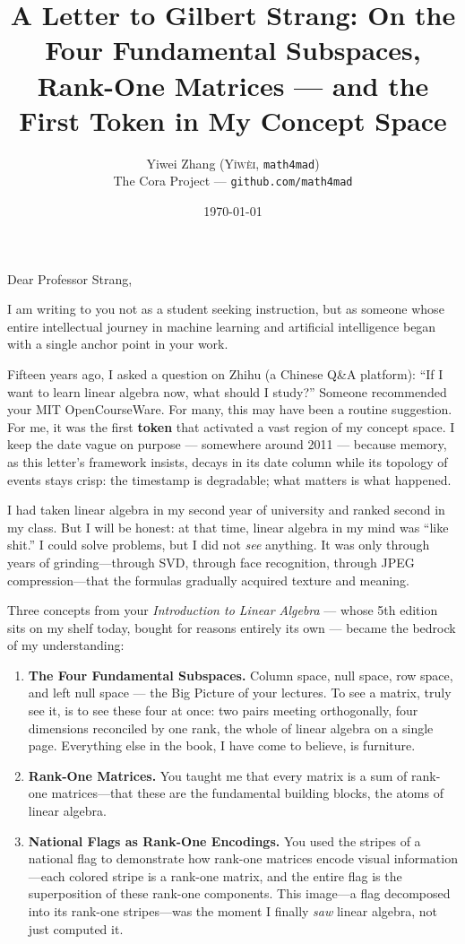 \documentclass[11pt, a4paper]{article}
\title{\textbf{A Letter to Gilbert Strang: On the Four Fundamental Subspaces, Rank-One Matrices --- and the First Token in My Concept Space}}
\author{Yiwei Zhang (\textsc{Y\v{i}w\`{e}i}, \texttt{math4mad}) \\ \small The Cora Project --- \texttt{github.com/math4mad}}
\date{\today}
\begin{document}
\maketitle

Dear Professor Strang,

I am writing to you not as a student seeking instruction, but as someone whose entire intellectual journey in machine learning and artificial intelligence began with a single anchor point in your work.

Fifteen years ago, I asked a question on Zhihu (a Chinese Q\&A platform): ``If I want to learn linear algebra now, what should I study?'' Someone recommended your MIT OpenCourseWare. For many, this may have been a routine suggestion. For me, it was the first \textbf{token} that activated a vast region of my concept space. I keep the date vague on purpose --- somewhere around 2011 --- because memory, as this letter's framework insists, decays in its date column while its topology of events stays crisp: the timestamp is degradable; what matters is what happened.

I had taken linear algebra in my second year of university and ranked second in my class. But I will be honest: at that time, linear algebra in my mind was ``like shit.'' I could solve problems, but I did not \textit{see} anything. It was only through years of grinding---through SVD, through face recognition, through JPEG compression---that the formulas gradually acquired texture and meaning.

Three concepts from your \textit{Introduction to Linear Algebra} --- whose 5th edition sits on my shelf today, bought for reasons entirely its own --- became the bedrock of my understanding:

\begin{enumerate}
    \item \textbf{The Four Fundamental Subspaces.} Column space, null space, row space, and left null space --- the Big Picture of your lectures. To see a matrix, truly see it, is to see these four at once: two pairs meeting orthogonally, four dimensions reconciled by one rank, the whole of linear algebra on a single page. Everything else in the book, I have come to believe, is furniture.
    \item \textbf{Rank-One Matrices.} You taught me that every matrix is a sum of rank-one matrices---that these are the fundamental building blocks, the atoms of linear algebra.
    \item \textbf{National Flags as Rank-One Encodings.} You used the stripes of a national flag to demonstrate how rank-one matrices encode visual information---each colored stripe is a rank-one matrix, and the entire flag is the superposition of these rank-one components. This image---a flag decomposed into its rank-one stripes---was the moment I finally \textit{saw} linear algebra, not just computed it.
\end{enumerate}
\end{document}

